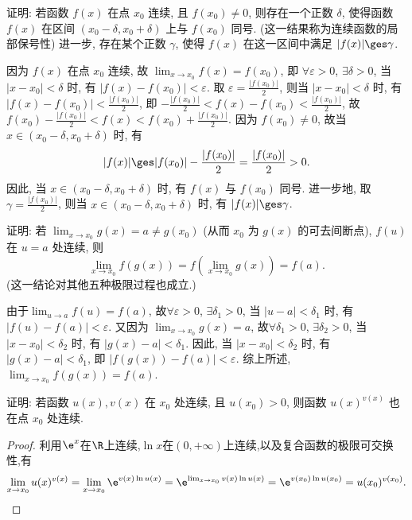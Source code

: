 \begin{exercise}[2.1.11]
    证明: 若函数 $f(x)$ 在点 $x_0$ 连续, 且 $f(x_0) \ne 0$, 则存在一个正数 $\delta$, 使得函数 $f(x)$ 在区间 $(x_0-\delta, x_0+\delta)$ 上与 $f(x_0)$ 同号. (这一结果称为连续函数的局部保号性) 进一步, 存在某个正数 $\gamma$, 使得 $f(x)$ 在这一区间中满足 $|f(x)| \ges \gamma$.
\end{exercise}

\begin{solution}
    因为 $f(x)$ 在点 $x_0$ 连续, 故 $\lim_{x \to x_0} f(x) = f(x_0)$, 即 $\forall \varepsilon > 0$, $\exists \delta > 0$, 当 $|x-x_0| < \delta$ 时, 有 $|f(x)-f(x_0)| < \varepsilon$. 取 $\varepsilon = \frac{|f(x_0)|}{2}$, 则当 $|x-x_0| < \delta$ 时, 有 $|f(x)-f(x_0)| < \frac{|f(x_0)|}{2}$, 即 $-\frac{|f(x_0)|}{2} < f(x)-f(x_0) < \frac{|f(x_0)|}{2}$, 故 $f(x_0)-\frac{|f(x_0)|}{2} < f(x) < f(x_0)+\frac{|f(x_0)|}{2}$. 因为 $f(x_0) \ne 0$, 故当 $x \in (x_0-\delta, x_0+\delta)$ 时, 有
    $$ |f(x)| \ges |f(x_0)| - \frac{|f(x_0)|}{2} = \frac{|f(x_0)|}{2} > 0. $$
    因此, 当 $x \in (x_0-\delta, x_0+\delta)$ 时, 有 $f(x)$ 与 $f(x_0)$ 同号. 进一步地, 取 $\gamma = \frac{|f(x_0)|}{2}$, 则当 $x \in (x_0-\delta, x_0+\delta)$ 时, 有 $|f(x)| \ges \gamma$.
\end{solution}

\begin{exercise}[2.1.12]
    证明: 若 $\lim_{x \to x_0} g(x) = a \ne g(x_0)$ (从而 $x_0$ 为 $g(x)$ 的可去间断点), $f(u)$ 在 $u=a$ 处连续, 则
    $$ \lim_{x \to x_0} f(g(x)) = f\left(\lim_{x \to x_0} g(x)\right) = f(a). $$
    (这一结论对其他五种极限过程也成立.)
\end{exercise}

\begin{solution}
    由于$\lim_{u \to a} f(u) = f(a)$, 故$\forall \varepsilon > 0$, $\exists \delta_1 > 0$, 当 $|u-a| < \delta_1$ 时, 有 $|f(u)-f(a)| < \varepsilon$. 又因为 $\lim_{x \to x_0} g(x) = a$, 故$\forall \delta_1 > 0$, $\exists \delta_2 > 0$, 当 $|x-x_0| < \delta_2$ 时, 有 $|g(x)-a| < \delta_1$. 因此, 当 $|x-x_0| < \delta_2$ 时, 有 $|g(x)-a| < \delta_1$, 即 $|f(g(x))-f(a)| < \varepsilon$. 综上所述, $\lim_{x \to x_0} f(g(x)) = f(a)$.
\end{solution}

\begin{exercise}[2.1.13]
    证明: 若函数 $u(x), v(x)$ 在 $x_0$ 处连续, 且 $u(x_0) > 0$, 则函数 $u(x)^{v(x)}$ 也在点 $x_0$ 处连续.
\end{exercise}

\begin{proof}
    利用$\e^x$在$\R$上连续,$\ln x$在$(0,+\infty)$上连续,以及复合函数的极限可交换性,有
    $$\lim_{x \to x_0} u(x)^{v(x)} = \lim_{x \to x_0} \e^{v(x) \ln u(x)} = \e^{\lim_{x \to x_0} v(x) \ln u(x)} = \e^{v(x_0) \ln u(x_0)} = u(x_0)^{v(x_0)}.$$
\end{proof}


